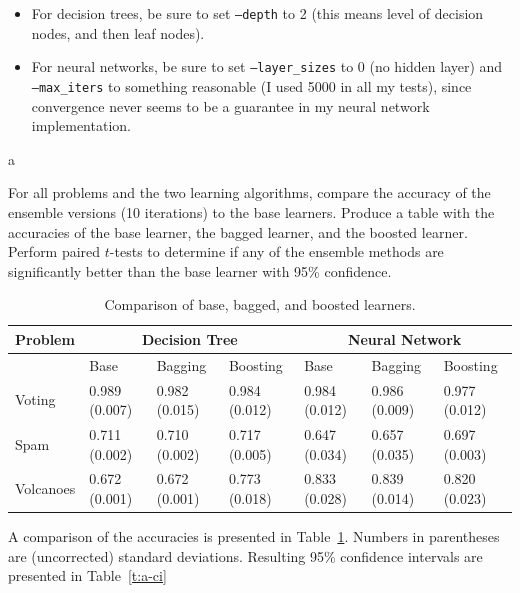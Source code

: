 \documentclass[fleqn]{homework}
\begin{document}
  \begin{itemize}
  \item For decision trees, be sure to set \texttt{--depth} to 2 (this means
    level of decision nodes, and then leaf nodes).
  \item For neural networks, be sure to set \texttt{--layer\_sizes} to 0 (no
    hidden layer) and \texttt{--max\_iters} to something reasonable (I used 5000
    in all my tests), since convergence never seems to be a guarantee in my
    neural network implementation.
  \end{itemize}

  \begin{problem}{a}
    \begin{question}
      For all problems and the two learning algorithms, compare the accuracy of
      the ensemble versions (10 iterations) to the base learners. Produce a
      table with the accuracies of the base learner, the bagged learner, and the
      boosted learner. Perform paired $t$-tests to determine if any of the
      ensemble methods are significantly better than the base learner with 95\%
      confidence.
    \end{question}
    \FloatBarrier

    \begin{table}[h]
    \centering
    \caption{Comparison of base, bagged, and boosted learners.}
    \label{t:a-comparison}
    \begin{tabular}{llll|lll}
      \toprule
      Problem & \multicolumn{3}{c}{Decision Tree} & \multicolumn{3}{c}{Neural Network} \\
      \midrule
             & Base          & Bagging       & Boosting      & Base          & Bagging      & Boosting       \\
      Voting & 0.989 (0.007) & 0.982 (0.015) & 0.984 (0.012) & 0.984 (0.012) & 0.986 (0.009) & 0.977 (0.012) \\
      Spam   & 0.711 (0.002) & 0.710 (0.002) & 0.717 (0.005) & 0.647 (0.034) & 0.657 (0.035) & 0.697 (0.003) \\
      Volcanoes&0.672 (0.001)& 0.672 (0.001) & 0.773 (0.018) & 0.833 (0.028) & 0.839 (0.014) & 0.820 (0.023) \\
      \bottomrule
    \end{tabular}
    \end{table}

    A comparison of the accuracies is presented in Table~\ref{t:a-comparison}.
    Numbers in parentheses are (uncorrected) standard deviations.  Resulting
    95\% confidence intervals are presented in Table~\ref{t:a-ci}


\end{problem}
\end{document}
